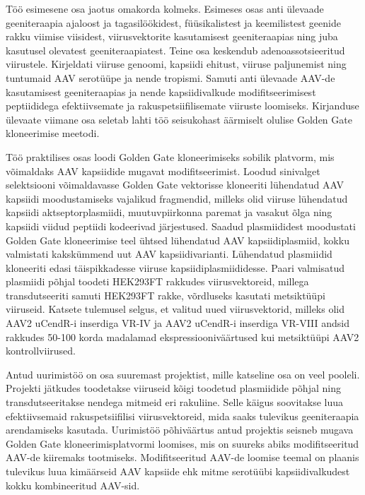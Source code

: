 \documentclass{trkut}%
\begin{document}
Töö esimesene osa jaotus omakorda kolmeks. Esimeses osas anti ülevaade geeniteraapia ajaloost ja tagasilöökidest, füüsikalistest ja keemilistest geenide rakku viimise viisidest, viirusvektorite kasutamisest geeniteraapias ning juba kasutusel olevatest geeniteraapiatest. Teine osa keskendub adenoassotsieeritud viirustele. Kirjeldati viiruse genoomi, kapsiidi ehitust, viiruse paljunemist ning tuntumaid AAV serotüüpe ja nende tropismi. Samuti anti ülevaade AAV-de kasutamisest geeniteraapias ja nende kapsiidivalkude modifitseerimisest peptiididega efektiivsemate ja rakuspetsiifilisemate viiruste loomiseks. Kirjanduse ülevaate viimane osa seletab lahti töö seisukohast äärmiselt olulise Golden Gate kloneerimise meetodi.

Töö praktilises osas loodi Golden Gate kloneerimiseks sobilik platvorm, mis võimaldaks AAV kapsiidide mugavat modifitseerimist. Loodud sinivalget selektsiooni võimaldavasse Golden Gate vektorisse kloneeriti lühendatud AAV kapsiidi moodustamiseks vajalikud fragmendid, milleks olid viiruse lühendatud kapsiidi aktseptorplasmiidi, muutuvpiirkonna paremat ja vasakut õlga ning kapsiidi viidud peptiidi kodeerivad järjestused. Saadud plasmiididest moodustati Golden Gate kloneerimise teel ühtsed lühendatud AAV kapsiidiplasmiid, kokku valmistati kakskümmend uut AAV kapsiidivarianti. Lühendatud plasmiidid kloneeriti edasi täispikkadesse viiruse kapsiidiplasmiididesse. Paari valmisatud plasmiidi põhjal toodeti HEK293FT rakkudes viirusvektoreid, millega transdutseeriti samuti HEK293FT rakke, võrdluseks kasutati metsiktüüpi viiruseid. Katsete tulemusel selgus, et valitud uued viirusvektorid, milleks olid AAV2 uCendR-i inserdiga VR-IV ja AAV2 uCendR-i inserdiga VR-VIII andsid rakkudes 50-100 korda madalamad ekspressiooniväärtused kui metsiktüüpi AAV2 kontrollviirused.

Antud uurimistöö on osa suuremast projektist, mille katseline osa on veel pooleli. Projekti jätkudes toodetakse viiruseid kõigi toodetud plasmiidide põhjal ning transdutseeritakse nendega mitmeid eri rakuliine. Selle käigus soovitakse luua efektiivsemaid rakuspetsiifilisi viirusvektoreid, mida saaks tulevikus geeniteraapia arendamiseks kasutada. Uurimistöö põhiväärtus antud projektis seisneb mugava Golden Gate kloneerimisplatvormi loomises, mis on suureks abiks modifitseeritud AAV-de kiiremaks tootmiseks. Modifitseeritud AAV-de loomise teemal on plaanis tulevikus luua kimäärseid AAV kapsiide ehk mitme serotüübi kapsiidivalkudest kokku kombineeritud AAV-sid.

\end{document}
